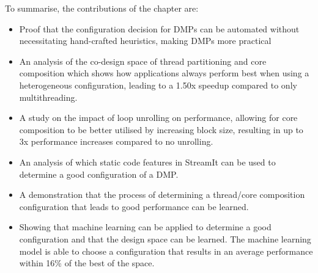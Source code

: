 To summarise, the contributions of the chapter are:
\vspace{-0.5em}
\begin{itemize}
\item Proof that the configuration decision for DMPs can be automated without necessitating hand-crafted heuristics, making DMPs more practical
\vspace{-0.5em}
\item An analysis of the co-design space of thread partitioning and core composition which shows how applications always perform best when using a heterogeneous configuration, leading to a 1.50x speedup compared to only multithreading.
\vspace{-0.5em}
\item A study on the impact of loop unrolling on performance, allowing for core composition to be better utilised by increasing block size, resulting in up to 3x performance increases compared to no unrolling.
\vspace{-0.5em}
\item An analysis of which static code features in StreamIt can be used to determine a good configuration of a DMP.
\vspace{-0.5em}
\item A demonstration that the process of determining a thread/core composition configuration that leads to good performance can be learned.
\vspace{-0.5em}
\item Showing that machine learning can be applied to determine a good configuration and that the design space can be learned. The machine learning model is able to choose a configuration that results in an average performance within 16\% of the best of the space.
\end{itemize}
